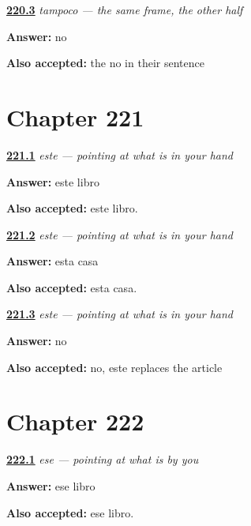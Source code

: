 \noindent\begin{minipage}[t]{\linewidth}
\raggedright
\hyperlink{review-ES-C58-tampoco-choose}{\textbf{220.3}} \emph{tampoco — the same frame, the other half}\par
\small \textbf{Answer:} no\par
\footnotesize \textbf{Also accepted:} the no in their sentence
\end{minipage}\par\medskip

\section*{Chapter 221}

\noindent\begin{minipage}[t]{\linewidth}
\raggedright
\hyperlink{review-ES-C59-este-say}{\textbf{221.1}} \emph{este — pointing at what is in your hand}\par
\small \textbf{Answer:} este libro\par
\footnotesize \textbf{Also accepted:} este libro.
\end{minipage}\par\medskip

\noindent\begin{minipage}[t]{\linewidth}
\raggedright
\hyperlink{review-ES-C59-este-agree}{\textbf{221.2}} \emph{este — pointing at what is in your hand}\par
\small \textbf{Answer:} esta casa\par
\footnotesize \textbf{Also accepted:} esta casa.
\end{minipage}\par\medskip

\noindent\begin{minipage}[t]{\linewidth}
\raggedright
\hyperlink{review-ES-C59-este-article}{\textbf{221.3}} \emph{este — pointing at what is in your hand}\par
\small \textbf{Answer:} no\par
\footnotesize \textbf{Also accepted:} no, este replaces the article
\end{minipage}\par\medskip

\section*{Chapter 222}

\noindent\begin{minipage}[t]{\linewidth}
\raggedright
\hyperlink{review-ES-C59-ese-say}{\textbf{222.1}} \emph{ese — pointing at what is by you}\par
\small \textbf{Answer:} ese libro\par
\footnotesize \textbf{Also accepted:} ese libro.
\end{minipage}\par\medskip

